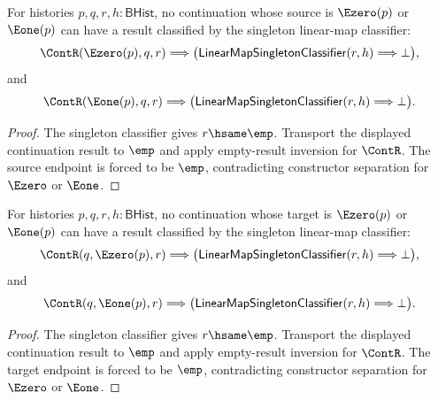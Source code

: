 \begin{theorem}
\label{thm:linearmap-singleton-classifier-continuation-visible-source-absurd}
For histories \(p,q,r,h:\mathsf{BHist}\), no continuation whose source is
\(\Ezero(p)\) or \(\Eone(p)\) can have a result classified by the singleton
linear-map classifier:
$$
\ContR(\Ezero(p),q,r)
\Longrightarrow
\bigl(\mathsf{LinearMapSingletonClassifier}(r,h)\Longrightarrow\bot\bigr),
$$
and
$$
\ContR(\Eone(p),q,r)
\Longrightarrow
\bigl(\mathsf{LinearMapSingletonClassifier}(r,h)\Longrightarrow\bot\bigr).
$$
\end{theorem}
\begin{proof}
The singleton classifier gives \(r\hsame\emp\). Transport the displayed
continuation result to \(\emp\) and apply empty-result inversion for
\(\ContR\). The source endpoint is forced to be \(\emp\), contradicting
constructor separation for \(\Ezero\) or \(\Eone\).
\end{proof}

\begin{theorem}
\label{thm:linearmap-singleton-classifier-continuation-visible-target-absurd}
For histories \(p,q,r,h:\mathsf{BHist}\), no continuation whose target is
\(\Ezero(p)\) or \(\Eone(p)\) can have a result classified by the singleton
linear-map classifier:
$$
\ContR(q,\Ezero(p),r)
\Longrightarrow
\bigl(\mathsf{LinearMapSingletonClassifier}(r,h)\Longrightarrow\bot\bigr),
$$
and
$$
\ContR(q,\Eone(p),r)
\Longrightarrow
\bigl(\mathsf{LinearMapSingletonClassifier}(r,h)\Longrightarrow\bot\bigr).
$$
\end{theorem}
\begin{proof}
The singleton classifier gives \(r\hsame\emp\). Transport the displayed
continuation result to \(\emp\) and apply empty-result inversion for
\(\ContR\). The target endpoint is forced to be \(\emp\), contradicting
constructor separation for \(\Ezero\) or \(\Eone\).
\end{proof}
